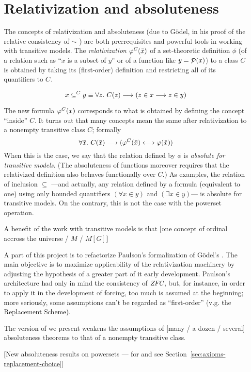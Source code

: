 \section{Relativization and absoluteness}
\label{sec:relat-absol}

The concepts of relativization and absoluteness (due to Gödel, in his
proof of the relative consistency of $\AC$ \cite{godel-L}) 
are both
prerrequisites and powerful tools in working with transitive
models. The \emph{relativization} $\phi^C(\bx)$ of a set-theoretic
definition
$\phi$ (of a relation such
as ``$x$ is a subset of $y$'' or of a function like $y=\P(x)$) to
a class $C$ is obtained by taking its (first-order) definition and
restricting all of its quantifiers to $C$.

\[
x \sbq^C y \equiv \forall z.\ C(z) \longrightarrow (z\in x
\longrightarrow z\in y)
\]

The new formula $\phi^C(\bx)$ corresponds to what is obtained by defining
the concept ``inside'' $C$. It turns out that many concepts mean the
same after relativization to a nonempty transitive class $C$; formally
\[
\forall\bx.\ C(\bx) \longrightarrow (\phi^C(\bx) \longleftrightarrow
\phi(\bx))
\]
When this is the case, we say that the relation defined by $\phi$ is
\emph{absolute for transitive models}. (The absoluteness of functions
moreover requires that
the relativized definition also behaves functionally over $C$.) As
examples, the relation of inclusion $\subseteq$ ---and actually, any
relation defined by a formula (equivalent to one) using only bounded
quantifiers 
$(\forall x\in y)$ and $(\exists x\in y)$--- is absolute for
transitive models. On the contrary, this is not the case with the powerset
operation.

A benefit of the work with transitive models is that [one concept of
  ordinal accross the universe / $M$ / $M[G]$]

A part of this project is to refactorize Paulson's formalization
\cite{paulson_2003} of Gödel's \cite{godel-L}. The main objective is
to maximize applicability of the relativization machinery by adjusting
the hypothesis of a greater part of it early development. Paulson's
architecture had only in mind the consistency of $\ZFC$, but, for
instance, in order to apply it in the development of forcing, too much
is assumed at the beginning; more seriously, some assumptions can't be
regarded as ``first-order'' (v.g. the Replacement Scheme).

The version of  we present weakens the
assumptions of [many / a dozen / several] absoluteness theorems to that
of a nonempty transitive class.

[New absoluteness results on powersets --- for  and
   see Section~\ref{sec:axioms-replacement-choice}]

